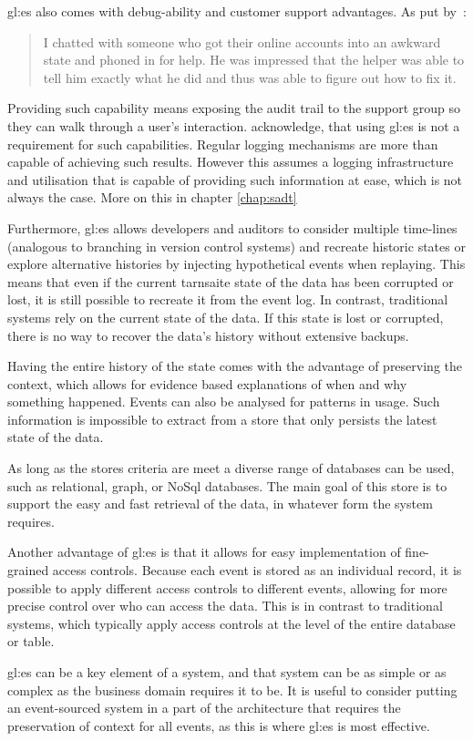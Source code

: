 \gls{gl:es} also comes with debug-ability and customer support advantages. As put by~\citep{fowleres}:

\begin{quote}
  I chatted with someone who got their online accounts into an awkward state and phoned in for help. He was impressed that the helper was able to tell him exactly what he did and thus was able to figure out how to fix it.
\end{quote}

Providing such capability means exposing the audit trail to the support group so they can walk through a user's interaction. \citep{fowleres} acknowledge, that using \gls{gl:es} is not a requirement for such capabilities. Regular logging mechanisms are more than capable of achieving such results. However this assumes a logging infrastructure and utilisation that is capable of providing such information at ease, which is not always the case. More on this in chapter \ref{chap:sadt}

Furthermore, \gls{gl:es} allows developers and auditors to consider multiple time-lines (analogous to branching in version control systems) and recreate historic states or explore alternative histories by injecting hypothetical events when replaying. This means that even if the current tarnsaite state of the data has been corrupted or lost, it is still possible to recreate it from the event log. In contrast, traditional systems rely on the current state of the data. If this state is lost or corrupted, there is no way to recover the data's history without extensive backups.

Having the entire history of the state comes with the advantage of preserving the context, which allows for evidence based explanations of when and why something happened. Events can also be analysed for patterns in usage. Such information is impossible to extract from a store that only persists the latest state of the data.

As long as the stores criteria are meet a diverse range of databases can be used, such as relational, graph, or NoSql databases. The main goal of this store is to support the easy and fast retrieval of the data, in whatever form the system requires.

Another advantage of \gls{gl:es} is that it allows for easy implementation of fine-grained access controls. Because each event is stored as an individual record, it is possible to apply different access controls to different events, allowing for more precise control over who can access the data. This is in contrast to traditional systems, which typically apply access controls at the level of the entire database or table.

\gls{gl:es} can be a key element of a system, and that system can be as simple or as complex as the business domain requires it to be. It is useful to consider putting an event-sourced system in a part of the architecture that requires the preservation of context for all events, as this is where \gls{gl:es} is most effective. 